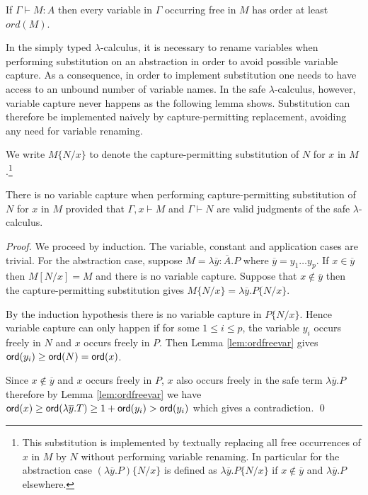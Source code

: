 \documentclass{llncs}
\newcommand\subst[2]{\left[ #1/#2 \right]}
\newcommand\captsubst[2]{\{#1/#2 \}}
\newcommand\ord[1]{{\sf ord}(#1)}
\begin{document}
\begin{lemma}
\label{lem:ordfreevar}
If $\Gamma \vdash M : A$ then every variable in $\Gamma$ occurring free in $M$ has order at least $ord(M)$.
\end{lemma}




In the simply typed $\lambda$-calculus, it is necessary to rename
variables when performing substitution on an abstraction in order to
avoid possible variable capture. As a consequence, in order to
implement substitution one needs to have access to an unbound number
of variable names.
In the safe $\lambda$-calculus, however, variable capture never happens as the following lemma shows. Substitution can therefore be implemented naively by capture-permitting replacement, avoiding any need for variable renaming.


We write $M\captsubst{N}{x}$ to denote the capture-permitting substitution of $N$ for $x$ in $M$.\footnote{This substitution is implemented
by textually replacing all free occurrences of $x$ in $M$ by $N$ without performing variable renaming.
In particular for the abstraction case
$(\lambda \overline{y} . P)\captsubst{N}{x}$ is
defined as $\lambda \overline{y} . P\captsubst{N}{x}$ if $x\not\in \overline{y}$ and $\lambda \overline{y} . P$ elsewhere.}

\begin{lemma}
\label{lem:homog_nocapture} There is
no variable capture when performing capture-permitting
substitution of $N$ for $x$ in $M$
provided that $\Gamma, x \vdash M$ and $\Gamma \vdash  N$ are valid judgments of the safe $\lambda$-calculus.
\end{lemma}

\begin{proof}
We proceed by induction. The variable, constant and
application cases are trivial. For the abstraction case, suppose $M
= \lambda \overline{y} : \overline{A}. P$ where $\overline{y} = y_1
\ldots y_p$. If $x \in \overline{y}$ then $M \subst{N}{x} = M$ and there is no variable capture.
Suppose that $x \not\in \overline{y}$ then the capture-permitting substitution gives
$M \captsubst{N}{x} = \lambda \overline{y} . P \captsubst{N}{x}$.

By the induction hypothesis there is no variable capture in $P \captsubst{N}{x}$.
Hence variable capture can only happen if for some $1 \leq i \leq p$, the variable $y_i$
occurs freely in $N$ and $x$ occurs freely in $P$. Then Lemma \ref{lem:ordfreevar} gives
$ \ord{y_i} \geq \ord{N} = \ord{x}$.

Since $x \not \in \overline{y}$ and $x$ occurs freely in $P$, $x$ also occurs freely in the safe term
$\lambda \overline{y}. P$ therefore by Lemma \ref{lem:ordfreevar} we have
$ \ord{x} \geq \ord{\lambda \overline{y} . T} \geq 1+ \ord{y_i} > \ord{y_i}$
which gives a contradiction. \qed
\end{proof}
\end{document}
